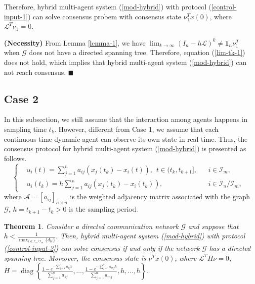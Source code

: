 \documentclass[12pt,draftcls,onecolumn]{IEEEtran}
\newtheorem{theorem}{Theorem}
\DeclareMathOperator{\diag}{diag}
\begin{document}
Therefore, hybrid multi-agent system (\ref{mod-hybrid}) with protocol (\ref{control-input-1}) can solve consensus probem with consensus state $\nu^{T}_{1}x(0)$, where $\mathscr{L}^T\nu_{1}=0$.

\textbf{(Necessity)} From Lemma \ref{lemma-1}, we have $\lim_{k\rightarrow \infty} (I_n-h\mathscr{L})^k\neq \mathbf{1}_n\nu^{T}_{1}$ when $\mathscr{G}$ does not have a directed spanning tree. Therefore, equation (\ref{lim-tk-1}) does not hold, which implies that hybrid multi-agent system (\ref{mod-hybrid}) can not reach consensus. $\blacksquare$



\subsection{Case 2}\label{s-case2}

In this subsection, we still assume that the interaction among agents happens in sampling time $t_k$. However, different from Case 1, we assume that each continuous-time dynamic agent can observe its own state in real time. Thus, the consensus protocol for hybrid multi-agent system (\ref{mod-hybrid}) is presented as follows. \begin{equation}\label{control-input-2}
\left\{
\begin{aligned}
&u_i(t)=\sum_{j=1}^na_{ij}(x_j(t_k)-x_i(t)),~~t\in (t_k,t_{k+1}], &&i\in \mathcal{I}_m,\\
&u_i(t_k)=h\sum_{j=1}^na_{ij}(x_j(t_k)-x_i(t_k)), &&i\in\mathcal{I}_{n}/\mathcal{I}_{m},
\end{aligned}
\right.
\end{equation}
where $\mathscr{A}=[a_{ij}]_{n\times n}$ is the weighted adjacency matrix
associated with the graph $\mathscr{G}$, $h=t_{k+1}-t_{k}>0$ is the sampling period.


\begin{theorem}\label{consensus-case2}
Consider a directed communication network $\mathscr{G}$ and suppose that $h<\frac{1}{\max_{i\in\mathcal{I}_{n}/\mathcal{I}_{m}}\{d_{ii}\}}$. Then, hybrid multi-agent system (\ref{mod-hybrid}) with protocol (\ref{control-input-2}) can solve consensus if and only if the network $\mathscr{G}$ has a directed spanning tree. Moreover, the consensus state is $\nu^{T}x(0)$, where $\mathscr{L}^TH\nu=0$,  $H=\diag\left\{\frac{1-e^{-\sum_{j=1}^na_{1j}h}}{\sum_{j=1}^na_{1j}},
\dots,\frac{1-e^{-\sum_{j=1}^na_{mj}h}}{\sum_{j=1}^na_{mj}},h,\dots,h\right\}$.
\end{theorem}
\end{document}
